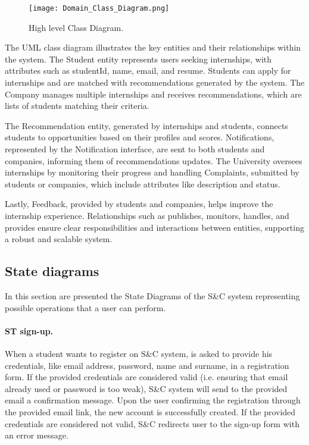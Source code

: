 \begin{figure}[H]
    \begin{center}
        \texttt{[image: Domain\_Class\_Diagram.png]}
        \caption{High level Class Diagram.}
        \label{fig:UML}%
    \end{center}
\end{figure}

The UML class diagram illustrates the key entities and their relationships within the system. The Student entity represents users seeking internships, with attributes such as studentId, name, email, and resume. Students can apply for internships and are matched with recommendations generated by the system. The Company manages multiple internships and receives recommendations, which are lists of students matching their criteria.

The Recommendation entity, generated by internships and students, connects students to opportunities based on their profiles and scores. Notifications, represented by the Notification interface, are sent to both students and companies, informing them of recommendations updates. The University oversees internships by monitoring their progress and handling Complaints, submitted by students or companies, which include attributes like description and status.

Lastly, Feedback, provided by students and companies, helps improve the internship experience. Relationships such as publishes, monitors, handles, and provides ensure clear responsibilities and interactions between entities, supporting a robust and scalable system.\\


\subsection{State diagrams}
\label{subsec:state_diagrams}%
In this section are presented the State Diagrams of the S\&C system representing possible operations that a user can perform.

\paragraph{ST sign-up.}
When a student wants to register on S\&C system, is asked to provide his credentials, like email address, password, name and surname,  in a registration form.
If the provided credentials are considered valid (i.e. ensuring that email already used or password is too weak), S\&C system will send to the provided email a confirmation message. Upon the user confirming the registration through the provided email link, the new account is successfully created.
If the provided credentials are considered not valid, S\&C redirects user to the sign-up form with an error message.

